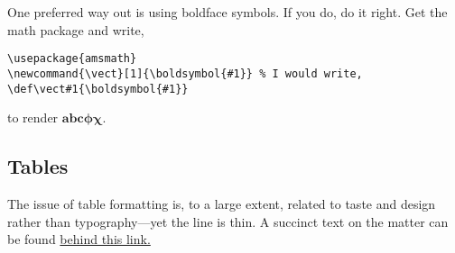 \documentclass{article}
\begin{document}
One preferred way out is using boldface symbols.  If you do, do it right.  Get the \AmS math package and write,
\begin{verbatim}
\usepackage{amsmath}
\newcommand{\vect}[1]{\boldsymbol{#1}} % I would write, \def\vect#1{\boldsymbol{#1}}
\end{verbatim}
to render $\boldsymbol{abc\phi\chi}$.


\subsection{Tables}
The issue of table formatting is, to a large extent, related to taste and design rather than
typography---yet the line is thin.  A succinct text on the matter can be found
\href{http://users.ece.cmu.edu/~pueschel/teaching/guides/guide-tables.pdf}{behind this link.}
\end{document}
